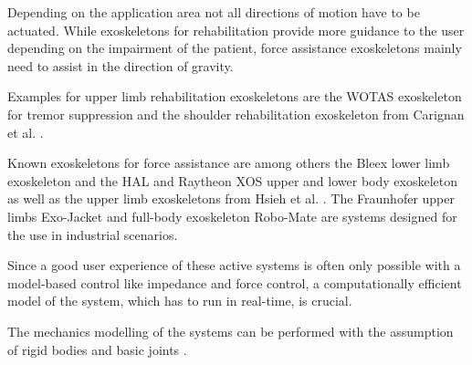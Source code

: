 \documentclass[letterpaper, 10 pt, conference]{ieeeconf}  %
\begin{document}

Depending on the application area not all directions of motion have to be actuated.
While exoskeletons for rehabilitation provide more guidance to the user depending on the impairment of the patient, force assistance exoskeletons mainly need to assist in the direction of gravity.
%
%

Examples for upper limb rehabilitation exoskeletons are the WOTAS exoskeleton for tremor suppression \cite{RoconBelRuiMan2007} and the shoulder rehabilitation exoskeleton from Carignan et al. \cite{CarignanLis2005}.

Known exoskeletons for force assistance are among others the Bleex lower limb exoskeleton \cite{ChuKazZos2005} and the HAL \cite{Sankai2010} and Raytheon XOS upper and lower body exoskeleton as well as the upper limb exoskeletons from Hsieh et al. \cite{HsiehChiLan2015}. 
The Fraunhofer upper limbs Exo-Jacket \cite{Ebrahimi2017} and full-body exoskeleton Robo-Mate \cite{StadlerAltSchSch2017} are systems designed for the use in industrial scenarios.

Since a good user experience of these active systems is often only possible with a model-based control like impedance and force control, a computationally efficient model of the system, which has to run in real-time, is crucial.


The mechanics modelling of the systems can be performed with the assumption of rigid bodies and basic joints \cite{Pons2008}.
\end{document}
